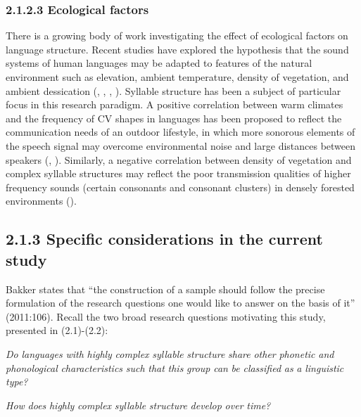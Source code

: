 \subsubsection{\textbf{2.1.2.3} \textbf{Ecological} \textbf{factors}}

  There is a growing body of work investigating the effect of ecological factors on language structure. Recent studies have explored the hypothesis that the sound systems of human languages may be adapted to features of the natural environment such as elevation, ambient temperature, density of vegetation, and ambient dessication (\citealt{Everett2013}, \citealt{MaddiesonCoupé2015}, \citealt{EverettEtAl2016}, \citealt{Everett2017}). Syllable structure has been a subject of particular focus in this research paradigm. A positive correlation between warm climates and the frequency of CV shapes in languages has been proposed to reflect the communication needs of an outdoor lifestyle, in which more sonorous elements of the speech signal may overcome environmental noise and large distances between speakers (\citealt{MunroeEtAl1996}, \citealt{FoughtEtAl2004}). Similarly, a negative correlation between density of vegetation and complex syllable structures may reflect the poor transmission qualities of higher frequency sounds (certain consonants and consonant clusters) in densely forested environments (\citealt{MaddiesonCoupé2015}).

\subsection{2.1.3 Specific considerations in the current study}

  Bakker states that “the construction of a sample should follow the precise formulation of the research questions one would like to answer on the basis of it” (2011:106). Recall the two broad research questions motivating this study, presented in (2.1)-(2.2):

\ea\label{ex:(2.1)}
   \textit{Do} \textit{languages} \textit{with} \textit{highly} \textit{complex} \textit{syllable} \textit{structure} \textit{share} \textit{other} \textit{phonetic} \textit{and} \textit{phonological} \textit{characteristics} \textit{such} \textit{that} \textit{this} \textit{group} \textit{can} \textit{be} \textit{classified} \textit{as} \textit{a} \textit{linguistic} \textit{type?}
\z

\ea\label{ex:(2.2)}
   \textit{How} \textit{does} \textit{highly} \textit{complex} \textit{syllable} \textit{structure} \textit{develop} \textit{over} \textit{time?}
\z

